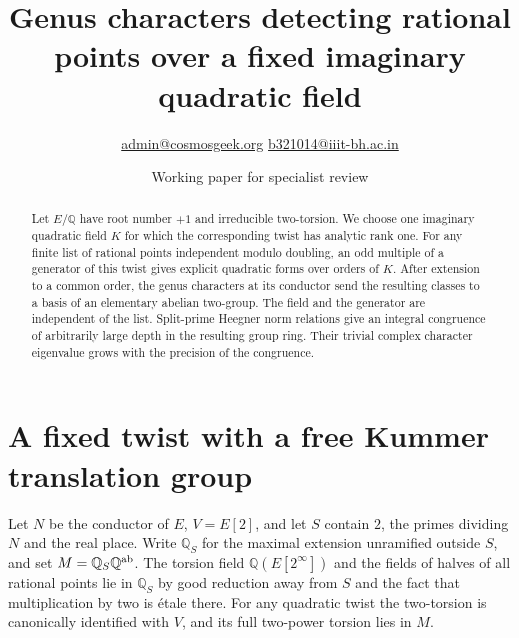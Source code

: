 \documentclass[11pt]{article}
\title{Genus characters detecting rational points over a fixed imaginary quadratic field}
\author{\small\href{mailto:admin@cosmosgeek.org}{admin@cosmosgeek.org}\quad
\href{mailto:b321014@iiit-bh.ac.in}{b321014@iiit-bh.ac.in}}
\date{Working paper for specialist review}
\newcommand{\Q}{\mathbb Q}\newcommand{\Z}{\mathbb Z}\newcommand{\F}{\mathbb F}
\begin{document}
\maketitle
\begin{abstract}
Let $E/\Q$ have root number $+1$ and irreducible two-torsion.
We choose one imaginary quadratic field $K$ for which the corresponding
twist has analytic rank one. For any finite list of rational points
independent modulo doubling, an odd multiple of a generator of this
twist gives explicit quadratic forms over orders of $K$. After
extension to a common order, the genus characters at its conductor
send the resulting classes to a basis of an elementary abelian
two-group. The field and the generator are independent of the list.
Split-prime Heegner norm relations give an integral congruence of
arbitrarily large depth in the resulting group ring. Their trivial
complex character eigenvalue grows with the precision of the congruence.
\end{abstract}

\section{A fixed twist with a free Kummer translation group}

Let $N$ be the conductor of $E$, $V=E[2]$, and let $S$ contain $2$,
the primes dividing $N$ and the real place. Write $\Q_S$ for the
maximal extension unramified outside $S$, and set
$M=\Q_S\Q^{\rm ab}$. The torsion field $\Q(E[2^\infty])$ and the
fields of halves of all rational points lie in $\Q_S$ by good
reduction away from $S$ and the fact that multiplication by two is
\'etale there. For any quadratic twist the two-torsion is canonically
identified with $V$, and its full two-power torsion lies in $M$.
\end{document}
